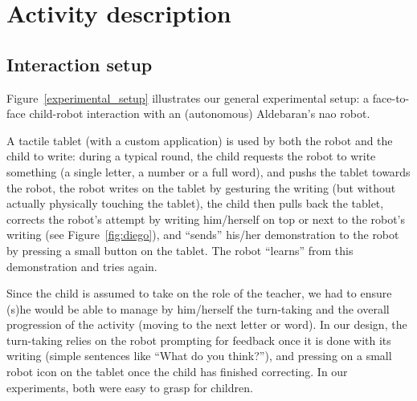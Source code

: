 \documentclass{sig-alternate}
\begin{document}

\section{Activity description}
\subsection{Interaction setup}
Figure~\ref{experimental_setup} illustrates our general experimental setup: a
face-to-face child-robot interaction with an (autonomous) Aldebaran's {\sc nao}
robot.

A tactile tablet (with a custom application) is used by both the robot and the
child to write: during a typical round, the child requests the robot to write
something (a single letter, a number or a full word), and pushs the tablet
towards the robot, the robot writes on the tablet by gesturing the writing (but
without actually physically touching the tablet), the child then pulls back the
tablet, corrects the robot's attempt by writing him/herself on top or next to
the robot's writing (see Figure~\ref{fig:diego}), and ``sends'' his/her
demonstration to the robot by pressing a small button on the tablet. The robot
``learns'' from this demonstration and tries again.

Since the child is assumed to take on the role of the teacher, we had to ensure
(s)he would be able to manage by him/herself the turn-taking and the overall
progression of the activity (moving to the next letter or word). In our design,
the turn-taking relies on the robot prompting for feedback once it is done with
its writing (simple sentences like ``What do you think?''), and pressing on a
small robot icon on the tablet once the child has finished correcting. In our
experiments, both were easy to grasp for children.
\end{document}
